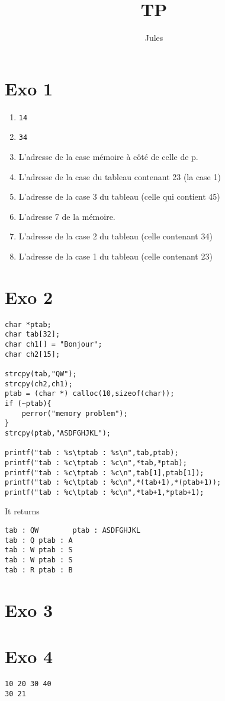\documentclass{article}
\title{TP}
\author{Jules}
\begin{document}
\maketitle


\section*{Exo 1}
\begin{enumerate}
    \item \texttt{14}
    \item \texttt{34}
    \item L'adresse de la case mémoire à côté de celle de p.
    \item L'adresse de la case du tableau contenant 23 (la case 1)
    \item L'adresse de la case 3 du tableau (celle qui contient 45)
    \item L'adresse 7 de la mémoire.
    \item L'adresse de la case 2 du tableau (celle contenant 34)
    \item L'adresse de la case 1 du tableau (celle contenant 23)
\end{enumerate}

\section*{Exo 2}
\begin{lstlisting}
char *ptab;
char tab[32];
char ch1[] = "Bonjour";
char ch2[15];

strcpy(tab,"QW");
strcpy(ch2,ch1);
ptab = (char *) calloc(10,sizeof(char));
if (~ptab){
    perror("memory problem");
}
strcpy(ptab,"ASDFGHJKL");

printf("tab : %s\tptab : %s\n",tab,ptab);
printf("tab : %c\tptab : %c\n",*tab,*ptab);
printf("tab : %c\tptab : %c\n",tab[1],ptab[1]);
printf("tab : %c\tptab : %c\n",*(tab+1),*(ptab+1));
printf("tab : %c\tptab : %c\n",*tab+1,*ptab+1);
\end{lstlisting}

It returns

\begin{lstlisting}
tab : QW        ptab : ASDFGHJKL
tab : Q ptab : A
tab : W ptab : S
tab : W ptab : S
tab : R ptab : B
\end{lstlisting}

\section*{Exo 3}



\section*{Exo 4}

\begin{lstlisting}
10 20 30 40
30 21
\end{lstlisting}
\end{document}
